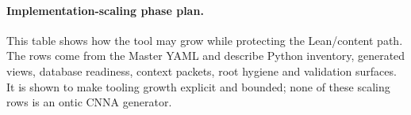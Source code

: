 \paragraph{Implementation-scaling phase plan.} This table shows how the tool may grow while protecting the Lean/content path. The rows come from the Master YAML and describe Python inventory, generated views, database readiness, context packets, root hygiene and validation surfaces. It is shown to make tooling growth explicit and bounded; none of these scaling rows is an ontic CNNA generator.

